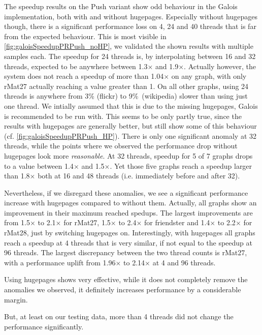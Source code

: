 The speedup results on the Push variant show odd behaviour in the Galois implementation, both with and without hugepages.
Especially without hugepages though, there is a significant performance loss on 4, 24 and 40 threads that is far from the expected behaviour. This is most visible in \autoref{fig:galoisSpeedupPRPush_noHP}, we validated the shown results with multiple samples each.
The speedup for 24 threads is, by interpolating between 16 and 32 threads, expected to be anywhere between 1.3$\times$ and 1.9$\times$.
Actually however, the system does not reach a speedup of more than 1.04$\times$ on any graph, with only rMat27 actually reaching a value greater than 1.
On all other graphs, using 24 threads is anywhere from 3\% (flickr) to 9\%\ (wikipedia) slower than using just one thread.
We intially assumed that this is due to the missing hugepages, Galois is recommended to be run with. This seems to be only partly true, since the results with hugepages are generally better, but still show some of this behaviour (cf. \autoref{fig:galoisSpeedupPRPush_HP}).
There is only one significant anomaly at 32 threads, while the points where we observed the performance drop without hugepages look more \emph{reasonable}.
At 32 threads, speedup for 5 of 7 graphs drops to a value between 1.4$\times$ and 1.5$\times$. Yet those five graphs reach a speedup larger than 1.8$\times$ both at 16 and 48 threads (i.e. immediately before and after 32).

Nevertheless, if we disregard these anomalies, we see a significant performance increase with hugepages compared to without them. Actually, all graphs show an improvement in their maximum reached spedups. The largest improvements are from 1.5$\times$ to 2.1$\times$ for rMat27, 1.5$\times$ to 2.4$\times$ for friendster and 1.4$\times$ to 2.2$\times$ for rMat28, just by switching hugepages on.
Interestingly, with hugepages all graphs reach a speedup at 4 threads that is very similar, if not equal to the speedup at 96 threads. The largest discrepancy between the two thread counts is rMat27, with a performance uplift from 1.96$\times$ to 2.14$\times$ at 4 and 96 threads.

Using hugepages shows very effective, while it does not completely remove the anomalies we observed, it definitely increases performance by a considerable margin.

But, at least on our testing data, more than 4 threads did not change the performance significantly.
